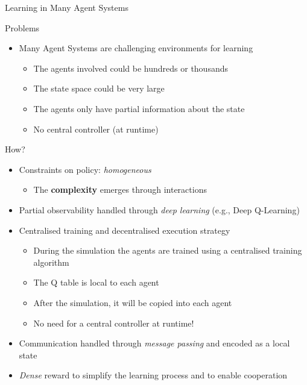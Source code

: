 \documentclass[presentation, 8pt]{beamer}\mode<presentation>{\usetheme{AMSBolognaFC}}
\begin{document}
\begin{frame}{Learning in Many Agent Systems}
	\begin{alertblock}{Problems}
		\begin{itemize}
			\item Many Agent Systems are challenging environments for learning
			\begin{itemize}
				\item The agents involved could be hundreds or thousands
				\item The state space could be very large
				\item The agents only have partial information about the state
				\item No central controller (at runtime)
			\end{itemize}
		\end{itemize}
	\end{alertblock}
	\begin{alertblock}{How?}
		\begin{itemize}
			\item Constraints on policy: \emph{homogeneous}
			\begin{itemize}
				\item The \textbf{complexity} emerges through interactions
			\end{itemize}
			\item Partial observability handled through \emph{deep learning} (e.g., Deep Q-Learning)
			\item Centralised training and decentralised execution strategy
			\begin{itemize}
				\item During the simulation the agents are trained using a centralised training algorithm
				\item The Q table is local to each agent
				\item After the simulation, it will be copied into each agent
				\item No need for a central controller at runtime!
			\end{itemize}
			\item Communication handled through \emph{message passing} and encoded as a local state
			\item \emph{Dense} reward to simplify the learning process and to enable cooperation
		\end{itemize}
	\end{alertblock}
\end{frame}
\end{document}
